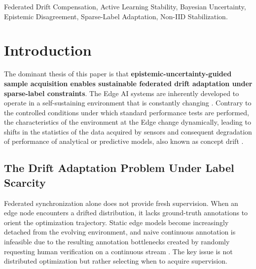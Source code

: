 \documentclass[conference]{IEEEtran}
\begin{document}
\begin{IEEEkeywords}
Federated Drift Compensation, Active Learning Stability, Bayesian Uncertainty, Epistemic Disagreement, Sparse-Label Adaptation, Non-IID Stabilization.
\end{IEEEkeywords}

\section{Introduction}

The dominant thesis of this paper is that \textbf{epistemic-uncertainty-guided sample acquisition enables sustainable federated drift adaptation under sparse-label constraints}. The Edge AI systems are inherently developed to operate in a self-sustaining environment that is constantly changing \cite{b1}. Contrary to the controlled conditions under which standard performance tests are performed, the characteristics of the environment at the Edge change dynamically, leading to shifts in the statistics of the data acquired by sensors and consequent degradation of performance of analytical or predictive models, also known as concept drift \cite{b28, b10}.

\subsection{The Drift Adaptation Problem Under Label Scarcity}
Federated synchronization alone does not provide fresh supervision. When an edge node encounters a drifted distribution, it lacks ground-truth annotations to orient the optimization trajectory. Static edge models become increasingly detached from the evolving environment, and naive continuous annotation is infeasible due to the resulting annotation bottlenecks created by randomly requesting human verification on a continuous stream \cite{b19, b11}. The key issue is not distributed optimization but rather selecting when to acquire supervision.
\end{document}
